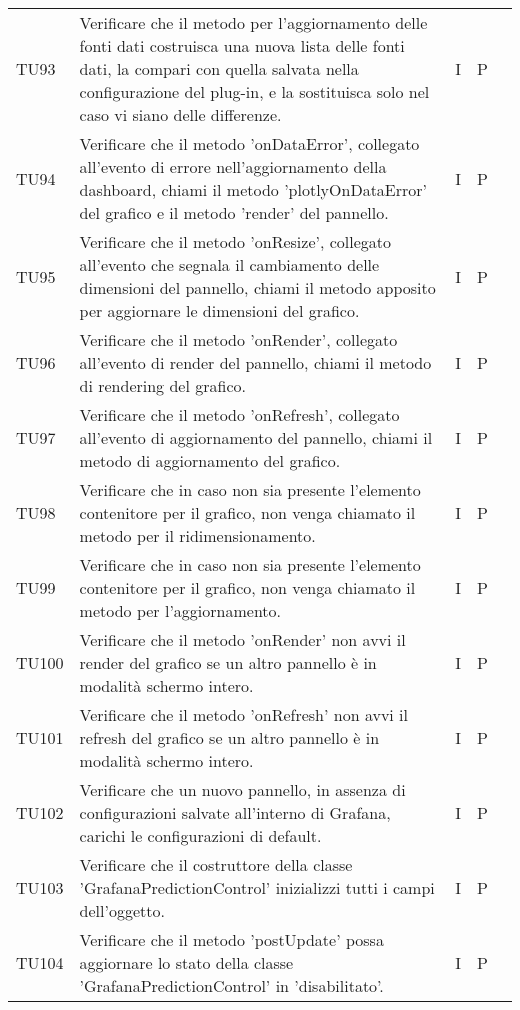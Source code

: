 \begin{longtable} {
		>{}p{15mm} 
		>{}p{79.5mm}
		>{}p{15mm} 
		>{}p{15mm}
		>{}p{0mm}}
	TU93		& Verificare che il metodo per l'aggiornamento delle fonti dati costruisca una nuova lista delle fonti dati, la compari con quella salvata nella configurazione del plug-in, e la sostituisca solo nel caso vi siano delle differenze. & I & P &\TBstrut \\ [2mm]
	TU94		& Verificare che il metodo 'onDataError', collegato all'evento di errore nell'aggiornamento della dashboard, chiami il metodo 'plotlyOnDataError' del grafico e il metodo 'render' del pannello.& I & P &\TBstrut \\ [2mm]
	TU95		& Verificare che il metodo 'onResize', collegato all'evento che segnala il cambiamento delle dimensioni del pannello, chiami il metodo apposito per aggiornare le dimensioni del grafico.& I & P &\TBstrut \\ [2mm]
	TU96		& Verificare che il metodo 'onRender', collegato all'evento di render del pannello, chiami il metodo di rendering del grafico.& I & P &\TBstrut \\ [2mm]
	TU97		& Verificare che il metodo 'onRefresh', collegato all'evento di aggiornamento del pannello, chiami il metodo di aggiornamento del grafico.& I & P &\TBstrut \\ [2mm]
	TU98		& Verificare che in caso non sia presente l'elemento contenitore per il grafico, non venga chiamato il metodo per il ridimensionamento.& I & P &\TBstrut \\ [2mm]
	TU99		& Verificare che in caso non sia presente l'elemento contenitore per il grafico, non venga chiamato il metodo per l'aggiornamento.& I & P &\TBstrut \\ [2mm]
	TU100		& Verificare che il metodo 'onRender' non avvi il render del grafico se un altro pannello è in modalità schermo intero.& I & P &\TBstrut \\ [2mm]
	TU101		& Verificare che il metodo 'onRefresh' non avvi il refresh del grafico se un altro pannello è in modalità schermo intero.& I & P &\TBstrut \\ [2mm]
	TU102		& Verificare che un nuovo pannello, in assenza di configurazioni salvate all'interno di Grafana, carichi le configurazioni di default.& I & P &\TBstrut \\ [2mm]
	TU103		& Verificare che il costruttore della classe 'GrafanaPredictionControl' inizializzi tutti i campi dell'oggetto.& I & P &\TBstrut \\ [2mm]
	TU104		& Verificare che il metodo 'postUpdate' possa aggiornare lo stato della classe 'GrafanaPredictionControl' in 'disabilitato'.& I & P &\TBstrut \\ [2mm]

\end{longtable}
